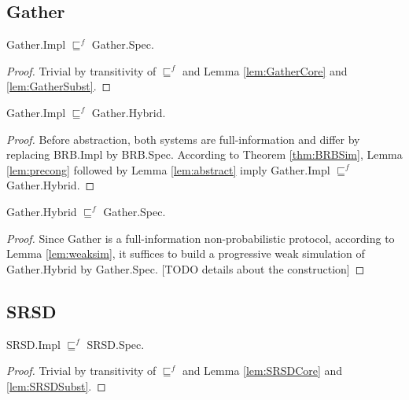 \subsection{Gather}

\begin{theorem}\label{thm:GatherSim}
    \textsf{Gather.Impl} $\sqsubseteq^f$ \textsf{Gather.Spec}.
\end{theorem}
\begin{proof}
    Trivial by transitivity of $\sqsubseteq^f$ and Lemma \ref{lem:GatherCore} and
    \ref{lem:GatherSubst}.
\end{proof}

\begin{lemma}\label{lem:GatherSubst}
    \textsf{Gather.Impl} $\sqsubseteq^f$ \textsf{Gather.Hybrid}.
\end{lemma}
\begin{proof}
    Before abstraction, both systems are full-information and differ by replacing \textsf{BRB.Impl}
    by \textsf{BRB.Spec}. According to Theorem \ref{thm:BRBSim},
    Lemma \ref{lem:precong} followed by Lemma \ref{lem:abstract} imply \textsf{Gather.Impl}
    $\sqsubseteq^f$ \textsf{Gather.Hybrid}.
\end{proof}

\begin{lemma}\label{lem:GatherCore}
    \textsf{Gather.Hybrid} $\sqsubseteq^f$ \textsf{Gather.Spec}.
\end{lemma}
\begin{proof}
    Since \textsf{Gather} is a full-information non-probabilistic protocol,
    according to Lemma \ref{lem:weaksim}, it suffices to build a progressive
    weak simulation of \textsf{Gather.Hybrid} by \textsf{Gather.Spec}.
    [TODO details about the construction]
\end{proof}

\subsection{SRSD}

\begin{theorem}\label{thm:SRSDSim}
    \textsf{SRSD.Impl} $\sqsubseteq^f$ \textsf{SRSD.Spec}.
\end{theorem}
\begin{proof}
    Trivial by transitivity of $\sqsubseteq^f$ and Lemma \ref{lem:SRSDCore} and \ref{lem:SRSDSubst}.
\end{proof}

